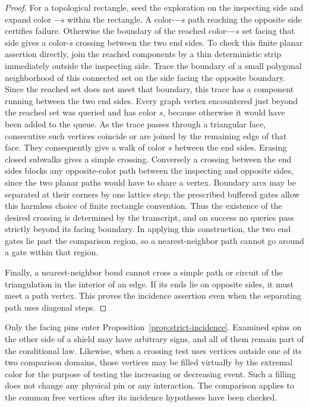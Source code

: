 \begin{proof}
For a topological rectangle, seed the exploration on the inspecting
side and expand color \(-s\) within the rectangle.  A color-\(-s\) path
reaching the opposite side certifies failure.  Otherwise the boundary
of the reached color-\(-s\) set facing that side gives a color-\(s\)
crossing between the two end sides.  To check this finite planar
assertion directly, join the reached components by a thin deterministic
strip immediately outside the inspecting side.  Trace the boundary of
a small polygonal neighborhood of this connected set on the side facing
the opposite boundary.  Since the reached set does not meet that
boundary, this trace has a component running between the two end sides.
Every graph vertex encountered just beyond the reached set was queried
and has color \(s\), because otherwise it would have been added to the
queue.  As the trace passes through a triangular face, consecutive such
vertices coincide or are joined by the remaining edge of that face.
They consequently give a walk of color \(s\) between the end sides.
Erasing closed subwalks gives a simple crossing.  Conversely a crossing
between the end sides blocks any opposite-color path between the
inspecting and opposite sides, since the two planar paths would have
to share a vertex.
Boundary arcs may be separated at their corners by one lattice step;
the prescribed buffered gates allow this harmless choice of finite
rectangle convention.  Thus the existence of the desired crossing is
determined by the transcript, and on success no queries pass strictly
beyond its facing boundary.  In applying this construction, the two end
gates lie past the comparison region, so a nearest-neighbor path cannot
go around a gate within that region.

Finally, a nearest-neighbor bond cannot cross a simple path or circuit
of the triangulation in the interior of an edge.  If its ends lie on
opposite sides, it must meet a path vertex.  This proves the incidence
assertion even when the separating path uses diagonal steps.
\end{proof}

Only the facing pins enter Proposition~\ref{prop:strict-incidence}.
Examined spins on the other side of a shield may have arbitrary signs,
and all of them remain part of the conditional law.  Likewise, when a
crossing test uses vertices outside one of its two comparison domains,
those vertices may be filled virtually by the extremal color for the
purpose of testing the increasing or decreasing event.  Such a filling
does not change any physical pin or any interaction.  The comparison
applies to the common free vertices after its incidence hypotheses have
been checked.

